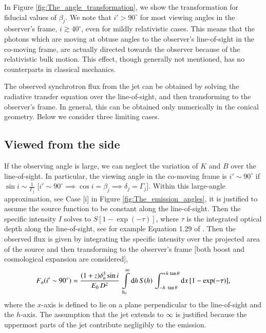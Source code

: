 In Figure \ref{fig:The_angle_transformation}, we show the transformation for fiducial values of $\beta_j$. We note that $i' > 90^{\circ}$ for most viewing angles in the observer's frame, $i \gtrsim 40^{\circ}$, even for mildly relativistic cases. This means that the photons which are moving at obtuse angles to the observer's line-of-sight in the co-moving frame, are actually directed towards the observer because of the relativistic bulk motion. This effect, though generally not mentioned, has no counterparts in classical mechanics. %

The observed synchrotron flux from the jet can be obtained by solving the radiative transfer equation over the line-of-sight, and then transforming to the observer's frame. In general, this can be obtained only numerically in the conical geometry. Below we consider three limiting cases.





\subsection{Viewed from the side}
\label{subsec:viewed_from_the_side}
If the observing angle is large, we can neglect the variation of $K$ and $B$ over the line-of-sight. In particular, the viewing angle in the co-moving frame is $i' \sim 90^{\circ}$ if $\sin i \sim \frac{1}{\Gamma_j}$ [$i' \sim 90^{\circ} \implies \cos i = \beta_j \implies \delta_j = \Gamma_j$]. Within this large-angle approximation, see Case [i] in Figure \ref{fig:The_emission_angles}, it is justified to assume the source function to be constant along the line-of-sight. Then the specific intensity $I$ solves to $ S [ 1 - \exp(-\tau) ] $, where $\tau$ is the integrated optical depth along the line-of-sight, see for example Equation 1.29 of . Then the observed flux is given by integrating the specific intensity over the projected area of the source and then transforming to the observer's frame [both boost and cosmological expansion are considered],
\begin{equation}
F_{n} (i' \sim 90^{\circ}) = \frac{ (1+z)\delta_n^{3} \sin i }{ \ee\, D^2 } \, \intop_{h_0}^{\infty} \dd h \, S(h) \, \int_{-h \ \tan \theta}^{+h \, \tan \theta} \dd x \, [1 - \exp(-\tau)],
\label{eq:Flux-n_beginning}
\end{equation} where the $x$-axis is defined to lie on a plane perpendicular to the line-of-sight and the $h$-axis. The assumption that the jet extends to $\infty$ is justified because the uppermost parts of the jet contribute negligibly to the emission.

